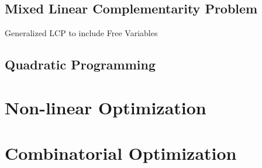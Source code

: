 \subsection{Mixed Linear Complementarity Problem}\label{sec:mlcp}

Generalized LCP to include Free Variables



\subsection{Quadratic Programming}\label{sec:quadratic_programming}



\section{Non-linear Optimization}\label{sec:nonlinear_optimization}

\section{Combinatorial Optimization}
\label{sec:combinatorial_optimization}
